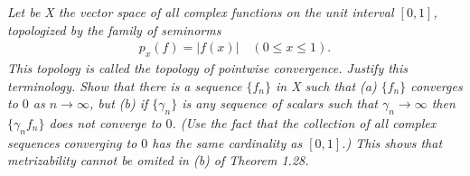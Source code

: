 \textit{
Let be X the vector space of all complex functions on the unit interval 
$[0, 1]$, topologized by the family of seminorms 
%
  \begin{align}
    p_{x}(f)=|f(x)| \quad (0\leq x\leq 1).\nonumber
  \end{align}
%
This topology is called the topology of pointwise convergence. 
Justify this terminology.
Show that there is a sequence $\{f_n\}$ in X such that (a) $\{f_n\}$ converges 
to $0$ as $n \to\infty$, but (b) if $\{γ_n\}$ is any sequence of scalars such 
that $γ_n\to\infty$ then $\{γ_nf_n\}$ does not converge to $0$. 
(Use the fact that the collection of all complex sequences converging to $0$ 
has the same cardinality as $[0, 1]$.)
This shows that metrizability cannot be omited in (b) of Theorem 1.28.
}

